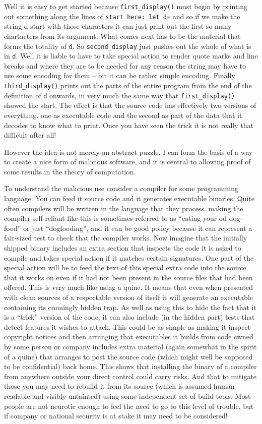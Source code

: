 Well it is easy to get started because \verb+first_display()+ must
begin by printing out something along the lines of
\verb+start here: let d=+ and so if we make the string d start with
those characters it can just print out the first so many chartacters
from its argument. What comes next has to be the material that
forms the totality of \verb+d+. So \verb+second_display+ just pushes
out the whole of what is in \verb+d+. Well it is liable to have to
take special action to render quote marks and line breaks and where
they are to be needed for any reason the string may have to use
some encoding for them -- bit it can be rather simple encoding.
Finally \verb+third_display()+ prints out the parts of the entire program
from the end of the definition of \verb+d+ onwards, in very much the
same way that \verb+first_display()+ showed the start.
The effect is that the source code has effectively two versions of everything.
one as executable code and the second as part of the data that it decodes
to know what to print. Once you have seen the trick it is not really
that difficult after all!

However the idea is not merely an abstract puzzle. I can form the
basis of a way to create a nice form of malicious software, and it
is central to allowing proof of some results in the theory of computation.

To understand the malicious use consider a compiler for some programming
language. You can feed it source code and it generates executable
binaries. Quite often compilers will be written in the language that they
process. making the compiler self-reliant like this is sometimes referred to
as ``eating your od dog-food'' or just ``dogfooding'', and it can be
good policy because it can represent a fair-sized test to check that
the compiler works. Now imagine that the initially shipped binary includes
an extra section that inspects the code it is asked to compile and takes
special action if it matches certain signatures. One part of the special
action will be to feed the text of this special extra code into the
source that it works on even if it had not been present in the source
files that had been offered. This is very much like using a quine. It
means that even when presented with clean sources of a respectable version
of itself it will generate an executable containing its cunningly hidden
trap. As well as using this to hide the fact that it is a ``trick'' version
of the code, it can also include (in the hidden part) tests that detect
features it wishes to attack. This could be as simple as making it
inspect copyright notices and then arranging that executables it builds
from code owned by some person or company includes extra material (again
somewhat in the spirit of a quine) that arranges to post the source
code (which might well be supposed to be confidential) back home.
This shows that installing the binary of a compiler from anywhere outside
your direct control could carry risks. And that to mitigate those you
may need to rebuild it from its source (which is assumed human readable and
visibly untainted) using some independent set of build tools. Most people
are not neurotic enough to feel the need to go to this level of trouble,
but if company or national security is at stake it may need to be considered!

